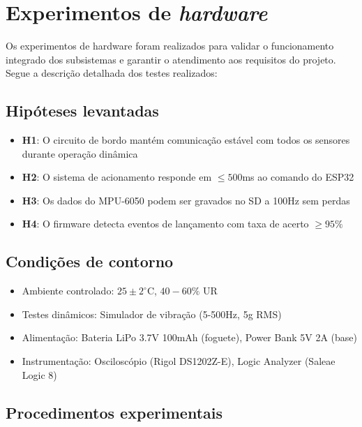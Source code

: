 \section{Experimentos de \textit{hardware}}

Os experimentos de hardware foram realizados para validar o funcionamento integrado dos subsistemas e garantir o atendimento aos requisitos do projeto. Segue a descrição detalhada dos testes realizados:

\subsection{Hipóteses levantadas}
\begin{itemize}
    \item \textbf{H1}: O circuito de bordo mantém comunicação estável com todos os sensores durante operação dinâmica
    \item \textbf{H2}: O sistema de acionamento responde em $\leq 500$ms ao comando do ESP32
    \item \textbf{H3}: Os dados do MPU-6050 podem ser gravados no SD a 100Hz sem perdas
    \item \textbf{H4}: O firmware detecta eventos de lançamento com taxa de acerto $\geq 95\%$
\end{itemize}

\subsection{Condições de contorno}
\begin{itemize}
    \item Ambiente controlado: $25 \pm 2^\circ$C, $40-60\%$ UR
    \item Testes dinâmicos: Simulador de vibração (5-500Hz, 5g RMS)
    \item Alimentação: Bateria LiPo 3.7V 100mAh (foguete), Power Bank 5V 2A (base)
    \item Instrumentação: Osciloscópio (Rigol DS1202Z-E), Logic Analyzer (Saleae Logic 8)
\end{itemize}

\subsection{Procedimentos experimentais}
